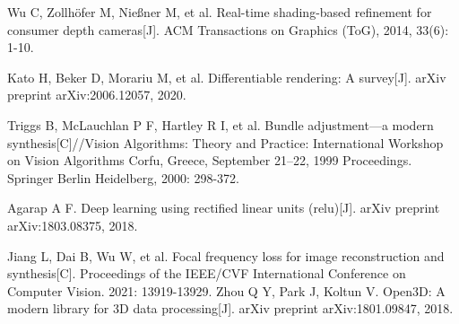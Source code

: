 Wu C, Zollhöfer M, Nießner M, et al. Real-time shading-based refinement for consumer depth cameras[J]. ACM Transactions on Graphics (ToG), 2014, 33(6): 1-10.

Kato H, Beker D, Morariu M, et al. Differentiable rendering: A survey[J]. arXiv preprint arXiv:2006.12057, 2020.


Triggs B, McLauchlan P F, Hartley R I, et al. Bundle adjustment—a modern synthesis[C]//Vision Algorithms: Theory and Practice: International Workshop on Vision Algorithms Corfu, Greece, September 21–22, 1999 Proceedings. Springer Berlin Heidelberg, 2000: 298-372.

Agarap A F. Deep learning using rectified linear units (relu)[J]. arXiv preprint arXiv:1803.08375, 2018.

Jiang L, Dai B, Wu W, et al. Focal frequency loss for image reconstruction and synthesis[C]. Proceedings of the IEEE/CVF International Conference on Computer Vision. 2021: 13919-13929.
Zhou Q Y, Park J, Koltun V. Open3D: A modern library for 3D data processing[J]. arXiv preprint arXiv:1801.09847, 2018.







